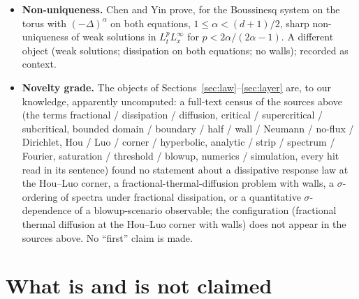 \documentclass[11pt,a4paper]{article}
\begin{document}
\begin{itemize}[leftmargin=1.5em]
\item \textbf{Non-uniqueness.} Chen and Yin \cite[Theorem~2.1]{CY25} prove, for the Boussinesq system on the torus with $(-\Delta)^\alpha$ on both equations, $1\le\alpha<(d+1)/2$, sharp non-uniqueness of weak solutions in $L^p_tL^\infty_x$ for $p<2\alpha/(2\alpha-1)$. A different object (weak solutions; dissipation on both equations; no walls); recorded as context.
\item \textbf{Novelty grade.} The objects of Sections~\ref{sec:law}--\ref{sec:layer} are, to our knowledge, apparently uncomputed: a full-text census of the sources above (the terms fractional / dissipation / diffusion, critical / supercritical / subcritical, bounded domain / boundary / half / wall / Neumann / no-flux / Dirichlet, Hou / Luo / corner / hyperbolic, analytic / strip / spectrum / Fourier, saturation / threshold / blowup, numerics / simulation, every hit read in its sentence) found no statement about a dissipative response law at the Hou--Luo corner, a fractional-thermal-diffusion problem with walls, a $\sigma$-ordering of spectra under fractional dissipation, or a quantitative $\sigma$-dependence of a blowup-scenario observable; the configuration (fractional thermal diffusion at the Hou--Luo corner with walls) does not appear in the sources above. No ``first'' claim is made.
\end{itemize}

\section{What is and is not claimed}\label{sec:claims}
\end{document}
